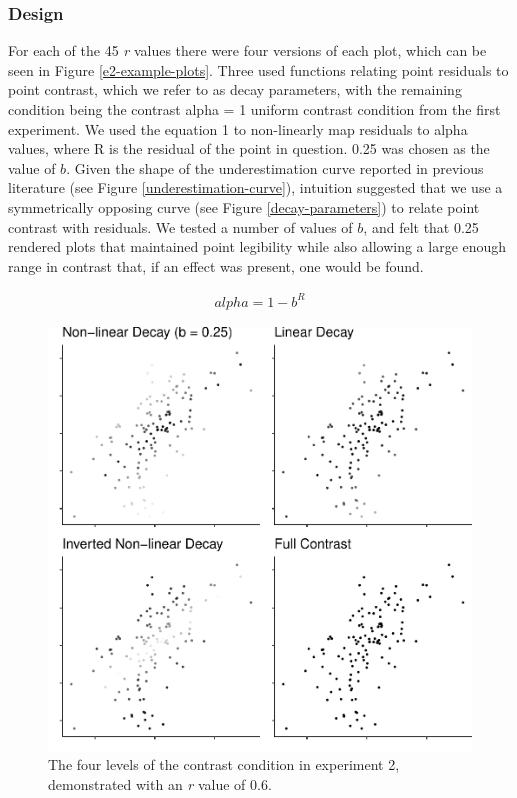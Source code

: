 \documentclass[preprint, 3p,
authoryear]{elsarticle} %
\begin{document}
\hypertarget{design-1}{%
\subsubsection{Design}\label{design-1}}

For each of the 45 \emph{r} values there were four versions of each
plot, which can be seen in Figure \ref{e2-example-plots}. Three used
functions relating point residuals to point contrast, which we refer to
as decay parameters, with the remaining condition being the contrast
alpha = 1 uniform contrast condition from the first experiment. We used
the equation 1 to non-linearly map residuals to alpha values, where R is
the residual of the point in question. 0.25 was chosen as the value of
\(b\). Given the shape of the underestimation curve reported in previous
literature (see Figure \ref{underestimation-curve}), intuition suggested
that we use a symmetrically opposing curve (see Figure
\ref{decay-parameters}) to relate point contrast with residuals. We
tested a number of values of \(b\), and felt that 0.25 rendered plots
that maintained point legibility while also allowing a large enough
range in contrast that, if an effect was present, one would be found.

\begin{align}
  alpha = 1 - b^R
\end{align}

\begin{figure}

\includegraphics[width=0.5\linewidth]{contrast_and_scatterplots_files/figure-latex/e2-example-plots-1} \hfill{}

\caption{\label{e2-example-plots}The four levels of the contrast condition in experiment 2, demonstrated with an \textit{r} value of 0.6.}\label{fig:e2-example-plots}
\end{figure}
\end{document}

